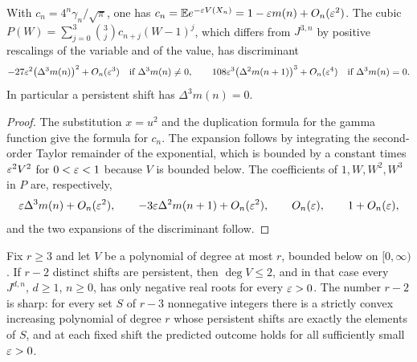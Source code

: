 \begin{lemma}\label{hec:lem:disc}
With $c_n=4^n\gamma_n/\sqrt\pi$, one has $c_n=\mathbb{E} e^{-\varepsilon V(X_n)}=1-\varepsilon m(n)+O_n(\varepsilon^2)$. The cubic
$P(W)=\sum_{j=0}^3\binom3jc_{n+j}(W-1)^j$, which differs from $J^{3,n}$ by positive rescalings of the
variable and of the value, has discriminant
\[
 -27\varepsilon^2\bigl(\Delta^3m(n)\bigr)^2+O_n(\varepsilon^3)\quad\text{if }\Delta^3m(n)\ne0,\qquad
 108\varepsilon^3\bigl(\Delta^2m(n+1)\bigr)^3+O_n(\varepsilon^4)\quad\text{if }\Delta^3m(n)=0 .
\]
In particular a persistent shift has $\Delta^3m(n)=0$.
\end{lemma}

\begin{proof}
The substitution $x=u^2$ and the duplication formula for the gamma function give the formula for $c_n$.
The expansion follows by integrating the second-order Taylor remainder of the exponential, which is
bounded by a constant times $\varepsilon^2V^2$ for $0<\varepsilon<1$ because $V$ is bounded below. The coefficients of
$1,W,W^2,W^3$ in $P$ are, respectively,
\[
 \varepsilon\Delta^3m(n)+O_n(\varepsilon^2),\qquad-3\varepsilon\Delta^2m(n+1)+O_n(\varepsilon^2),\qquad O_n(\varepsilon),\qquad1+O_n(\varepsilon),
\]
and the two expansions of the discriminant follow.
\end{proof}

\begin{theorem}\label{hec:thm:finitejensen}
Fix $r\ge3$ and let $V$ be a polynomial of degree at most $r$, bounded below on $[0,\infty)$. If $r-2$
distinct shifts are persistent, then $\deg V\le2$, and in that case every $J^{d,n}$, $d\ge1$, $n\ge0$, has
only negative real roots for every $\varepsilon>0$. The number $r-2$ is sharp: for every set $S$ of $r-3$
nonnegative integers there is a strictly convex increasing polynomial of degree $r$ whose persistent shifts
are exactly the elements of $S$, and at each fixed shift the predicted outcome holds for all sufficiently
small $\varepsilon>0$.
\end{theorem}

